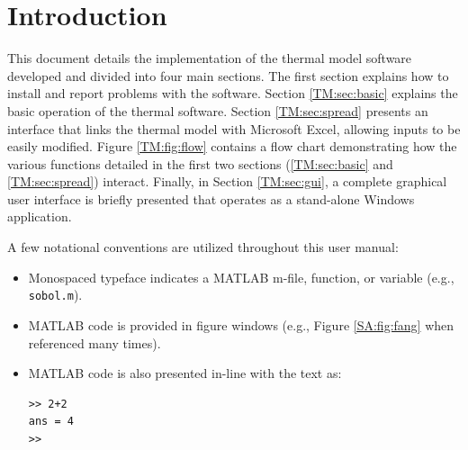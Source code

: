 \section{Introduction}
This document details the implementation of the thermal model software developed and divided into four main sections.  The first section explains how to install and report problems with the software. Section \ref{TM:sec:basic} explains the basic operation of the thermal software.  Section \ref{TM:sec:spread} presents an interface that links the thermal model with Microsoft Excel, allowing inputs to be easily modified.  Figure \ref{TM:fig:flow} contains a flow chart demonstrating how the various functions detailed in the first two sections (\ref{TM:sec:basic} and \ref{TM:sec:spread}) interact. Finally, in Section \ref{TM:sec:gui}, a complete graphical user interface is briefly presented that operates as a stand-alone Windows application.

A few notational conventions are utilized throughout this user manual:
\begin{itemize}
\item Monospaced typeface indicates a MATLAB m-file, function, or variable (e.g., \texttt{sobol.m}).
\item MATLAB code is provided in figure windows (e.g., Figure \ref{SA:fig:fang} when referenced many times).
\item MATLAB code is also presented in-line with the text as:
\begin{lstlisting}[style=inline]
>> 2+2
ans = 4 
>>
\end{lstlisting}\vspace*{0pt}
\end{itemize}

